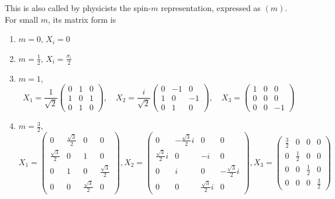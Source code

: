 \documentclass[12pt]{book}
\begin{document}
	This is also called by physicists the spin-$m$ representation, expressed as $(m)$. For small $m$, its matrix form is
	\begin{enumerate}
		\item $m=0$, $X_i=0$
		\item $m=\frac 12$, $X_i=\frac{\sigma_i}2$
		\item $m=1$, 
			\begin{equation}
			X_1 =\frac 1{\sqrt 2}
			\left( \begin{array}{ccc}
			0&1&0\\
			1&0&1\\
			0&1&0  
			\end{array} \right)
			,\quad X_2 =\frac i{\sqrt 2}
			\left( \begin{array}{ccc}
			0&-1&0\\
			1&0&-1\\
			0&1&0  
			\end{array} \right)
			,\quad X_3 =
			\left( \begin{array}{ccc}
			1&0&0\\
			0&0&0\\
			0&0&-1  
			\end{array} \right)
			\end{equation}
		\item $m=\frac 32$, 
			\begin{equation}
			X_1 =
			\left( \begin{array}{cccc}
			0&\frac{\sqrt 3}2&0&0\\
			\frac{\sqrt 3}2&0&1&0\\
			0&1&0&\frac{\sqrt 3}2\\
			0&0&\frac{\sqrt 3}2&0  
			\end{array} \right)
			, X_2 =
			\left( \begin{array}{cccc}
			0&-\frac{\sqrt 3}2i&0&0\\
			\frac{\sqrt 3}2i&0&-i&0\\
			0&i&0&-\frac{\sqrt 3}2i\\
			0&0&\frac{\sqrt 3}2i&0
			\end{array} \right)
			, X_3 =
			\left( \begin{array}{cccc}
			\frac 32&0&0&0\\
			0&\frac 12&0&0\\
			0&0&\frac 12&0\\
			0&0&0&\frac 32  
			\end{array} \right)
			\end{equation}
	\end{enumerate}
	
\end{document}
